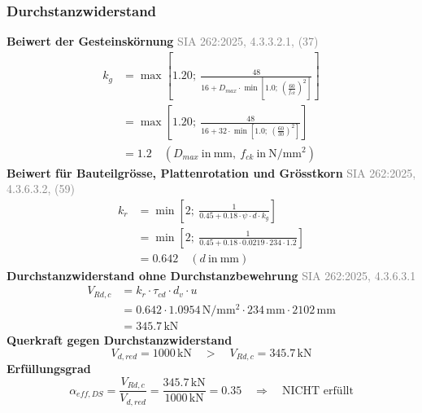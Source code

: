 \documentclass[11pt,a4paper]{article}
\newcommand{\normref}[1]{{\small\textcolor{gray}{#1}}}
\begin{document}
\subsubsection{Durchstanzwiderstand}
\noindent\textbf{Beiwert der Gesteinskörnung} \hfill \normref{SIA 262:2025, 4.3.3.2.1, (37)}
\begin{equation*}
\begin{aligned}
  k_g &= \max\left[1.20;\ \frac{48}{16 + D_{max} \cdot \min\left[1.0;\ \left(\frac{60}{f_{ck}}\right)^{2}\right]}\right] \\
  &= \max\left[1.20;\ \frac{48}{16 + 32 \cdot \min\left[1.0;\ \left(\frac{60}{30}\right)^{2}\right]}\right] \\
  &= 1.2 \quad \left(D_{max}\ \text{in}\ \mathrm{mm},\ f_{ck}\ \text{in}\ \mathrm{N}/\mathrm{mm}^{2}\right)
\end{aligned}
\end{equation*}
\noindent\textbf{Beiwert für Bauteilgrösse, Plattenrotation und Grösstkorn} \hfill \normref{SIA 262:2025, 4.3.6.3.2, (59)}
\begin{equation*}
\begin{aligned}
  k_r &= \min\left[2;\ \frac{1}{0.45 + 0.18 \cdot \psi \cdot d \cdot k_g}\right] \\
  &= \min\left[2;\ \frac{1}{0.45 + 0.18 \cdot 0.0219 \cdot 234 \cdot 1.2}\right] \\
  &= 0.642 \quad \left(d\ \text{in}\ \mathrm{mm}\right)
\end{aligned}
\end{equation*}
\noindent\textbf{Durchstanzwiderstand ohne Durchstanzbewehrung} \hfill \normref{SIA 262:2025, 4.3.6.3.1}
\begin{equation*}
\begin{aligned}
  V_{Rd,c} &= k_r \cdot \tau_{cd} \cdot d_v \cdot u \\
  &= 0.642 \cdot 1.0954\,\mathrm{N}/\mathrm{mm}^{2} \cdot 234\,\mathrm{mm} \cdot 2102\,\mathrm{mm} \\
  &= 345.7\,\mathrm{kN}
\end{aligned}
\end{equation*}
\noindent\textbf{Querkraft gegen Durchstanzwiderstand}
\begin{equation*}
V_{d,red} = 1000\,\mathrm{kN} \quad > \quad V_{Rd,c} = 345.7\,\mathrm{kN}
\end{equation*}
\noindent\textbf{Erfüllungsgrad}
\begin{equation*}
\alpha_{eff,DS} = \frac{V_{Rd,c}}{V_{d,red}} = \frac{345.7\,\mathrm{kN}}{1000\,\mathrm{kN}} = 0.35 \quad \Rightarrow \quad \text{NICHT erfüllt}
\end{equation*}
\end{document}
